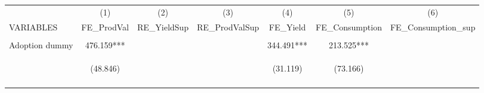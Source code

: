 \begin{center}
\begin{tabular}{lcccccc} \hline
 & (1) & (2) & (3) & (4) & (5) & (6) \\
VARIABLES & FE\_ProdVal & RE\_YieldSup & RE\_ProdValSup & FE\_Yield & FE\_Consumption & FE\_Consumption\_sup \\ \hline
\vspace{4pt} & \begin{footnotesize}\end{footnotesize} & \begin{footnotesize}\end{footnotesize} & \begin{footnotesize}\end{footnotesize} & \begin{footnotesize}\end{footnotesize} & \begin{footnotesize}\end{footnotesize} & \begin{footnotesize}\end{footnotesize} \\
Adoption dummy & 476.159*** &  &  & 344.491*** & 213.525*** &  \\
 & \begin{footnotesize}(48.846)\end{footnotesize} & \begin{footnotesize}\end{footnotesize} & \begin{footnotesize}\end{footnotesize} & \begin{footnotesize}(31.119)\end{footnotesize} & \begin{footnotesize}(73.166)\end{footnotesize} & \begin{footnotesize}\end{footnotesize} \\
\vspace{4pt} & \begin{footnotesize}[0.000]\end{footnotesize} & \begin{footnotesize}\end{footnotesize} & \begin{footnotesize}\end{footnotesize} & \begin{footnotesize}[0.000]\end{footnotesize} & \begin{footnotesize}[0.004]\end{footnotesize} & \begin{footnotesize}\end{footnotesize} \\

\end{tabular}
\end{center}

